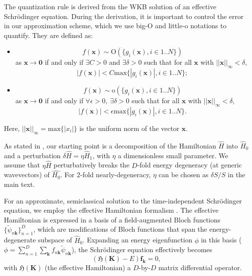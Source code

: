 \documentclass[aps, showpacs, twocolumn, notitlepage, superscriptaddress]{revtex4-1}
\begin{document}
The quantization rule is derived from the WKB solution of an effective Schr\"odinger equation. During the derivation, it is important to control the error in our approximation scheme, which we use big-O and little-o notations to quantify. They are defined as: 
\begin{itemize}
    \item 
    \begin{equation}
        f(\boldsymbol{x})\sim\text{O}(\{g_i(\boldsymbol{x}), i\in 1..N\})
    \end{equation}
    as $\boldsymbol{x}\to\boldsymbol{0}$ if and only if $\exists C>0$ and $\exists \delta>0$ such that for all $\boldsymbol{x}$ with $||\boldsymbol{x}||_\infty<\delta$,
    \begin{equation}
        |f(\boldsymbol{x})|<C\text{max}\{|g_i(\boldsymbol{x})|, i\in 1..N\};
    \end{equation}
    \item 
    \begin{equation}
        f(\boldsymbol{x})\sim\text{o}(\{g_i(\boldsymbol{x}), i\in 1..N\})
    \end{equation}
    as $\boldsymbol{x}\to\boldsymbol{0}$ if and only if $\forall \epsilon>0,~\exists \delta>0$ such that for all $\boldsymbol{x}$ with $||\boldsymbol{x}||_\infty<\delta$,
    \begin{equation}
        |f(\boldsymbol{x})|<\epsilon\text{max}\{|g_i(\boldsymbol{x})|, i\in 1..N\}.
    \end{equation}
\end{itemize}
Here, $||\boldsymbol{x}||_\infty=\text{max}\{|x_i|\}$ is the uniform norm of the vector $\boldsymbol{x}$.

As stated in , our starting point is a decomposition of the Hamiltonian $\hat{H}$ into $\hat{H}_0$ and a perturbation $\delta\hat{H}=\eta\hat{H}_1$, with $\eta$ a dimensionless small parameter. We assume that $\eta\hat{H}$ perturbatively breaks the  $D$-fold energy degeneracy (at generic wavevectors) of $\hat{H_0}$. For 2-fold nearly-degeneracy, $\eta$ can be chosen as $\delta S/S$ in the main text.

For an approximate, semiclassical solution to the time-independent Schr\"odinger equation, we employ the effective Hamiltonian formalism \cite{rotheffham,100p}.  The effective Hamiltonian is expressed in a basis of a field-augmented Bloch functions $\{\tilde{\psi}_{n\boldsymbol{k}}\}_{n=1}^D$,\cite{rotheffham} which are modifications of Bloch functions that span the  energy-degenerate subspace of $\hat{H}_0$. Expanding an energy eigenfunction $\phi$ in this basis ($\phi=\sum_{n=1}^D\sum_{\boldsymbol{k}}f_{n\boldsymbol{k}}\tilde{\psi}_{n\boldsymbol{k}}$), the Schr\"odinger equation effectively becomes
\begin{equation}
(\mathfrak{H}(\boldsymbol{K})-E)\boldsymbol{f}_{\boldsymbol{k}}=0,\label{eq:schrodinger}
\end{equation}
with $\mathfrak{H}(\boldsymbol{K})$ (the effective Hamiltonian) a $D$-by-$D$ matrix differential operator. 
\end{document}
